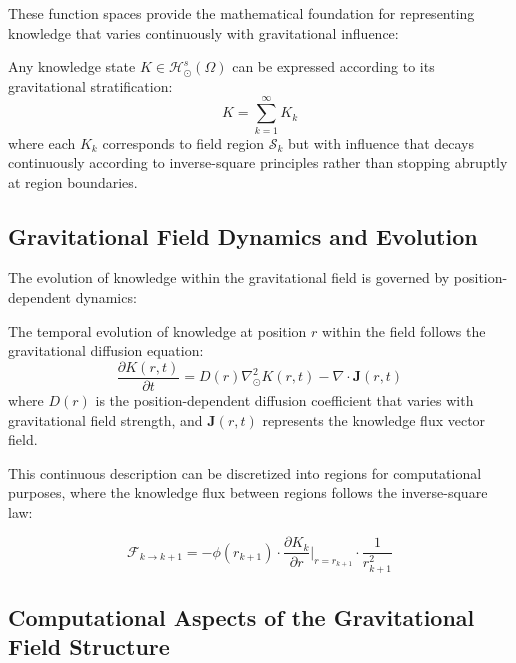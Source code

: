 These function spaces provide the mathematical foundation for representing knowledge that varies continuously with gravitational influence:

\begin{theorem}
Any knowledge state $K \in \mathcal{H}_{\odot}^s(\Omega)$ can be expressed according to its gravitational stratification:
\begin{equation}
K = \sum_{k=1}^{\infty} K_k
\end{equation}
where each $K_k$ corresponds to field region $\mathcal{S}_k$ but with influence that decays continuously according to inverse-square principles rather than stopping abruptly at region boundaries.
\end{theorem}

\subsection{Gravitational Field Dynamics and Evolution}

The evolution of knowledge within the gravitational field is governed by position-dependent dynamics:

\begin{proposition}
The temporal evolution of knowledge at position $r$ within the field follows the gravitational diffusion equation:
\begin{equation}
\frac{\partial K(r,t)}{\partial t} = D(r) \nabla_{\odot}^2 K(r,t) - \nabla \cdot \mathbf{J}(r,t)
\end{equation}
where $D(r)$ is the position-dependent diffusion coefficient that varies with gravitational field strength, and $\mathbf{J}(r,t)$ represents the knowledge flux vector field.
\end{proposition}

This continuous description can be discretized into regions for computational purposes, where the knowledge flux between regions follows the inverse-square law:

\begin{equation}
\mathcal{F}_{k \to k+1} = -\phi(r_{k+1}) \cdot \frac{\partial K_k}{\partial r}\bigg|_{r=r_{k+1}} \cdot \frac{1}{r_{k+1}^2}
\end{equation}

\subsection{Computational Aspects of the Gravitational Field Structure}

